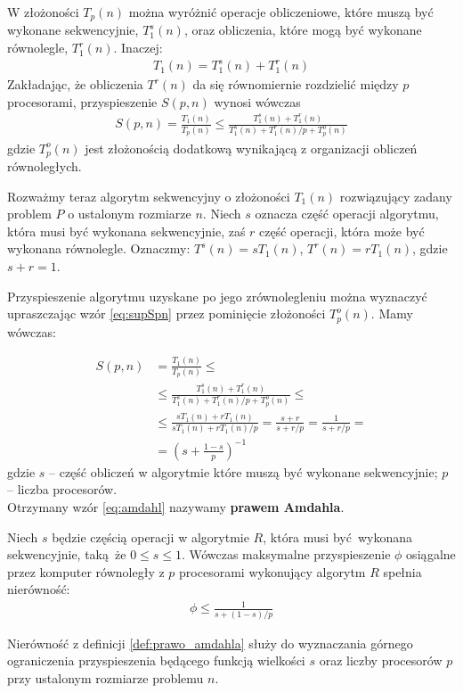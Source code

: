W złożoności \(T_{p}(n)\) można wyróżnić operacje obliczeniowe, które muszą być wykonane sekwencyjnie, \(T^{s}_{1}(n)\), oraz obliczenia, które mogą być wykonane równolegle, \(T^{r}_{1}(n)\). Inaczej:
\begin{align}
T_{1}(n) = T^{s}_{1}(n) + T^{r}_{1}(n)
\end{align}
Zakładając, że obliczenia \(T^{r}(n)\) da się równomiernie rozdzielić między \(p\) procesorami, przyspieszenie \(S(p, n)\) wynosi wówczas
\begin{align}\label{eq:supSpn}
S(p, n) = \frac{T_{1}(n)}{T_{p}(n)}\leq\frac{T^{s}_{1}(n) + T^{r}_{1}(n)}{T^{s}_{1}(n) + T^{r}_{1}(n)/p + T^{o}_{p}(n)}
\end{align}
gdzie \(T^{o}_{p}(n)\) jest złożonością dodatkową wynikającą z organizacji obliczeń równoległych.


Rozważmy teraz algorytm sekwencyjny o złożoności \(T_{1}(n)\) rozwiązujący zadany problem \(P\) o ustalonym rozmiarze \(n\). Niech \(s\) oznacza część operacji algorytmu, która musi być wykonana sekwencyjnie, zaś \(r\) część operacji, która może być wykonana równolegle. Oznaczmy: \(T^{s}(n) = sT_{1}(n)\), \(T^{r}(n)=rT_{1}(n)\), gdzie \(s+r=1\). 


Przyspieszenie algorytmu uzyskane po jego zrównolegleniu można wyznaczyć upraszczając wzór \eqref{eq:supSpn} przez pominięcie złożoności \(T^{o}_{p}(n)\). Mamy wówczas:

\begin{equation*}\label{eq:amdahl}
\begin{split}
S(p, n) &= \frac{T_{1}(n)}{T_{p}(n)}\leq\\
&\leq \frac{T^{s}_{1}(n) + T^{r}_{1}(n)}{T^{s}_{1}(n) + T^{r}_{1}(n)/p + T^{o}_{p}(n)}\leq\\
&\leq \frac{sT_{1}(n) + rT_{1}(n)}{sT_{1}(n) + rT_{1}(n)/p} = \frac{s+r}{s+r/p} = \frac{1}{s+r/p}= \\
&= \left(s+\frac{1-s}{p}\right)^{-1}
\end{split}
\end{equation*}
gdzie \(s\) – część obliczeń w algorytmie które muszą być wykonane sekwencyjnie; \(p\) – liczba procesorów.\\
Otrzymany wzór \eqref{eq:amdahl} nazywamy \textbf{prawem Amdahla}. 

\begin{definicja}\label{def:prawo_amdahla}
Niech \(s\) będzie częścią operacji w algorytmie \(R\), która musi być wykonana sekwencyjnie, taką że \(0\leq s \leq 1\). Wówczas maksymalne przyspieszenie \(\phi\) osiągalne przez komputer równoległy z \(p\) procesorami wykonujący algorytm \(R\) spełnia nierówność:
\begin{align*}
\phi \leq \frac{1}{s+(1-s)/p}
\end{align*}
\end{definicja}
Nierówność z definicji \ref{def:prawo_amdahla} służy do wyznaczania górnego ograniczenia przyspieszenia będącego funkcją wielkości \(s\) oraz liczby procesorów \(p\) przy ustalonym rozmiarze problemu \(n\).

